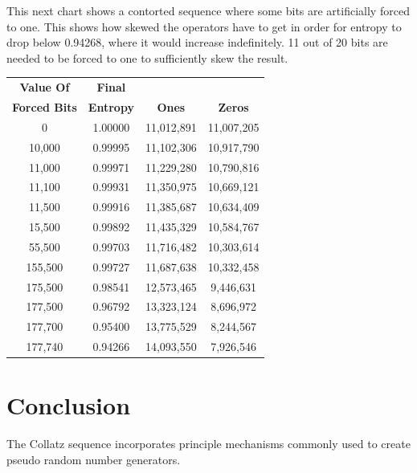 \documentclass[letterpaper]{article}
\begin{document}
\begin{multicols}{2}
This next chart shows a contorted sequence where some bits are artificially forced to one. This shows how skewed the operators have to get in order for entropy to drop below 0.94268, where it would increase indefinitely. 11 out of 20 bits are needed to be forced to one to sufficiently skew the result.

\begin{center}
\begin{tabular}{|c|c|c|c|}
\hline
\textbf{Value Of} & \textbf{Final} &&\\
\textbf{Forced Bits} & \textbf{Entropy} & \textbf{Ones} & \textbf{Zeros} \\
\hline
0 & 1.00000 & 11,012,891 & 11,007,205 \\
10,000 & 0.99995 & 11,102,306 & 10,917,790 \\
11,000 & 0.99971 & 11,229,280 & 10,790,816 \\
11,100 & 0.99931 & 11,350,975 & 10,669,121 \\
11,500 & 0.99916 & 11,385,687 & 10,634,409 \\
15,500 & 0.99892 & 11,435,329 & 10,584,767 \\
55,500 & 0.99703 & 11,716,482 & 10,303,614 \\
155,500 & 0.99727 & 11,687,638 & 10,332,458 \\
175,500 & 0.98541 & 12,573,465 & 9,446,631 \\
177,500 & 0.96792 & 13,323,124 & 8,696,972 \\
177,700 & 0.95400 & 13,775,529 & 8,244,567 \\
177,740 & 0.94266 & 14,093,550 & 7,926,546 \\
\hline
\end{tabular}
\end{center}

\section{Conclusion}

The Collatz sequence incorporates principle mechanisms commonly used to create pseudo random number generators.


\end{multicols}
\end{document}
